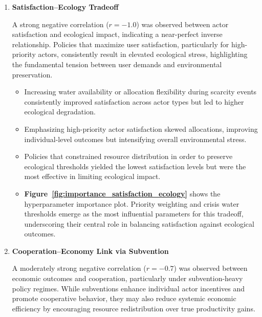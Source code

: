 \documentclass[a4paper, 12pt]{article}
\begin{document}
\begin{enumerate}

    \item \textbf{Satisfaction--Ecology Tradeoff}  
    
    A strong negative correlation ($r = -1.0$) was observed between actor satisfaction and ecological impact, indicating a near-perfect inverse relationship. Policies that maximize user satisfaction, particularly for high-priority actors, consistently result in elevated ecological stress, highlighting the fundamental tension between user demands and environmental preservation.

    \begin{itemize}
        \item Increasing water availability or allocation flexibility during scarcity events consistently improved satisfaction across actor types but led to higher ecological degradation.
        \item Emphasizing high-priority actor satisfaction skewed allocations, improving individual-level outcomes but intensifying overall environmental stress.
        \item Policies that constrained resource distribution in order to preserve ecological thresholds yielded the lowest satisfaction levels but were the most effective in limiting ecological impact.
        \item \textbf{Figure~\ref{fig:importance_satisfaction_ecology}} shows the hyperparameter importance plot. Priority weighting and crisis water thresholds emerge as the most influential parameters for this tradeoff, underscoring their central role in balancing satisfaction against ecological outcomes.
    \end{itemize}

    \item \textbf{Cooperation--Economy Link via Subvention}

    A moderately strong negative correlation ($r = -0.7$) was observed between economic outcomes and cooperation, particularly under subvention-heavy policy regimes. While subventions enhance individual actor incentives and promote cooperative behavior, they may also reduce systemic economic efficiency by encouraging resource redistribution over true productivity gains.


\end{enumerate}
\end{document}

